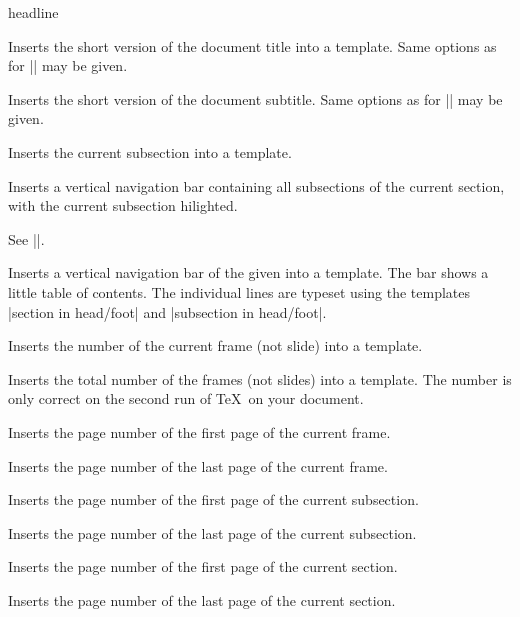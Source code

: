 \begin{element}{headline}
\begin{itemize}
    \iteminsert{\insertshorttitle}
    Inserts the short version of the document title into a template. Same
    options as for |\insertshortauthor| may be given. 

    \iteminsert{\insertshortsubtitle}
    Inserts the short version of the document subtitle. Same
    options as for |\insertshortauthor| may be given. 

    \iteminsert{\insertsubsection}
    Inserts the current subsection into a template.

    \iteminsert{\insertsubsectionnavigation}
    Inserts a vertical navigation bar containing all subsections of the
    current section, with the current subsection hilighted.

    \iteminsert{\insertsubsectionnavigationhorizontal}
    
    See |\insertsectionnavigationhorizontal|.

    \iteminsert{\insertverticalnavigation}
    Inserts a vertical navigation bar of the given  into a
    template. The bar shows a little table of contents. The individual
    lines are typeset using the templates
    |section in head/foot| and |subsection in head/foot|.

    \iteminsert{\insertframenumber}
    Inserts the number of the current frame (not slide) into a template.

    \iteminsert{\inserttotalframenumber}
    Inserts the total number of the frames (not slides) into a
    template. The number is only correct on the second run of \TeX\ on
    your document.

    \iteminsert{\insertframestartpage}
    Inserts the page number of the first page of the current frame.

    \iteminsert{\insertframeendpage}
    Inserts the page number of the last page of the current frame.

    \iteminsert{\insertsubsectionstartpage}
    Inserts the page number of the first page of the current subsection.

    \iteminsert{\insertsubsectionendpage}
    Inserts the page number of the last page of the current subsection.

    \iteminsert{\insertsectionstartpage}
    Inserts the page number of the first page of the current section.

    \iteminsert{\insertsectionendpage}
    Inserts the page number of the last page of the current section.


\end{itemize}
\end{element}
